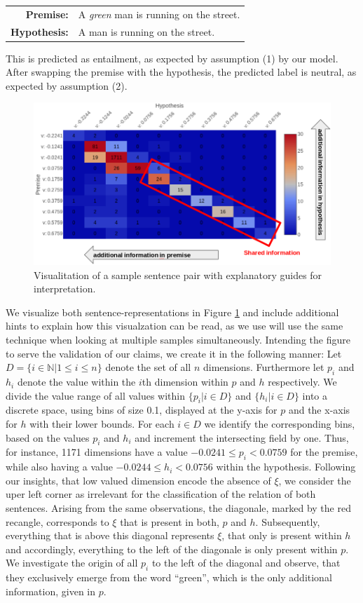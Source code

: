 \begin{center}
\begin{tabular}{rl}
\textbf{Premise:} & A \textit{green} man is running on the street.
\\
\textbf{Hypothesis:} & A man is running on the street.
\end{tabular}
\end{center}
This is predicted as entailment, as expected by assumption (1) by our model. After swapping the premise with the hypothesis, the predicted label is neutral, as expected by assumption (2).
\begin{figure}[tph!]
\centering
	\includegraphics[totalheight=6cm]{fig/sample_coverage_prob.png}
	\caption{Visualitation of a sample sentence pair with explanatory guides for interpretation.}
	\label{fig:sample_coverage_prob}
\end{figure}
We visualize both sentence-representations in Figure \ref{fig:sample_coverage_prob} and include additional hints to explain how this visualzation can be read, as we use will use the same technique when looking at multiple samples simultaneously. Intending the figure to serve the validation of our claims, we create it in the following manner: Let $D = \{i \in \mathbb{N} | 1 \leq i \leq n\}$ denote the set of all $n$ dimensions. Furthermore let $p_i$ and $h_i$ denote the value within the $i$th dimension within $p$ and $h$ respectively. We divide the value range of all values within $\{p_i | i \in D\}$ and $\{h_i | i \in D\}$ into a discrete space, using bins of size 0.1, displayed at the y-axis for $p$ and the x-axis for $h$ with their lower bounds. For each $i \in D$ we identify the corresponding bins, based on the values $p_i$ and $h_i$ and increment the intersecting field by one. Thus, for instance, 1171 dimensions have a value $-0.0241 \leq p_i < 0.0759$ for the premise, while also having a value $-0.0244 \leq h_i < 0.0756$ within the hypothesis. Following our insights, that low valued dimension encode the absence of $\xi$, we consider the uper left corner as irrelevant for the classification of the relation of both sentences. Arising from the same observations, the diagonale, marked by the red recangle, corresponds to $\xi$ that is present in both, $p$ and $h$. Subsequently, everything that is above this diagonal represents $\xi$, that only is present within $h$ and accordingly, everything to the left of the diagonale is only present within $p$. We investigate the origin of all $p_i$ to the left of the diagonal and observe, that they exclusively emerge from the word ``green'', which is the only additional information, given in $p$.
